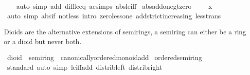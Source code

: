 \begin{isabellebody}
%
\isadelimproof
\ \ %
\endisadelimproof
%
\isatagproof
{}\isamarkupfalse%
\ {\isacharparenleft}{\kern0pt}auto\ simp\ add{\isacharcolon}{\kern0pt}\ diff{\isacharunderscore}{\kern0pt}le{\isacharunderscore}{\kern0pt}eq\ ac{\isacharunderscore}{\kern0pt}simps\ abs{\isacharunderscore}{\kern0pt}le{\isacharunderscore}{\kern0pt}iff{\isacharparenright}{\kern0pt}%
\endisatagproof
{\isafoldproof}%
%
\isadelimproof
\isanewline
%
\endisadelimproof
\isanewline
{}\isamarkupfalse%
\ abs{\isacharunderscore}{\kern0pt}add{\isacharunderscore}{\kern0pt}one{\isacharunderscore}{\kern0pt}gt{\isacharunderscore}{\kern0pt}zero{\isacharcolon}{\kern0pt}\ {\isachardoublequoteopen}{}\ {\isacharless}{\kern0pt}\ {}\ {\isacharplus}{\kern0pt}\ {\isasymbar}x{\isasymbar}{\isachardoublequoteclose}\isanewline
%
\isadelimproof
\ \ %
\endisadelimproof
%
\isatagproof
{}\isamarkupfalse%
\ {\isacharparenleft}{\kern0pt}auto\ simp{\isacharcolon}{\kern0pt}\ abs{\isacharunderscore}{\kern0pt}if\ not{\isacharunderscore}{\kern0pt}less\ intro{\isacharcolon}{\kern0pt}\ zero{\isacharunderscore}{\kern0pt}less{\isacharunderscore}{\kern0pt}one\ add{\isacharunderscore}{\kern0pt}strict{\isacharunderscore}{\kern0pt}increasing\ less{\isacharunderscore}{\kern0pt}trans{\isacharparenright}{\kern0pt}%
\endisatagproof
{\isafoldproof}%
%
\isadelimproof
\isanewline
%
\endisadelimproof
\isanewline
{}\isamarkupfalse%
%
\isadelimdocument
%
\endisadelimdocument
%
\isatagdocument
%
\isamarkuptrue%
%
\endisatagdocument
{\isafolddocument}%
%
\isadelimdocument
%
\endisadelimdocument
%
\begin{isamarkuptext}%
Dioids are the alternative extensions of semirings, a semiring can
  either be a ring or a dioid but never both.%
\end{isamarkuptext}\isamarkuptrue%
\isamarkupfalse%
\ dioid\ {\isacharequal}{\kern0pt}\ semiring{\isacharunderscore}{\kern0pt}{}\ {\isacharplus}{\kern0pt}\ canonically{\isacharunderscore}{\kern0pt}ordered{\isacharunderscore}{\kern0pt}monoid{\isacharunderscore}{\kern0pt}add\isanewline
{}\isanewline
\isanewline
{}\isamarkupfalse%
\ ordered{\isacharunderscore}{\kern0pt}semiring\isanewline
%
\isadelimproof
\ \ %
\endisadelimproof
%
\isatagproof
{}\isamarkupfalse%
\ standard\ {\isacharparenleft}{\kern0pt}auto\ simp{\isacharcolon}{\kern0pt}\ le{\isacharunderscore}{\kern0pt}iff{\isacharunderscore}{\kern0pt}add\ distrib{\isacharunderscore}{\kern0pt}left\ distrib{\isacharunderscore}{\kern0pt}right{\isacharparenright}{\kern0pt}%

\end{isabellebody}
